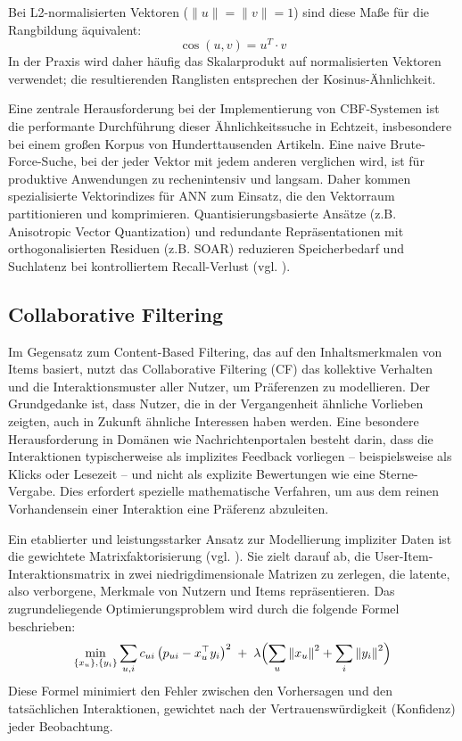 Bei L2-normalisierten Vektoren ($\lVert u \rVert = \lVert v \rVert = 1$) sind diese Maße für die Rangbildung äquivalent:
\[
\cos(u,v) = u^{T} \cdot v
\]
In der Praxis wird daher häufig das Skalarprodukt auf normalisierten Vektoren verwendet; 
die resultierenden Ranglisten entsprechen der Kosinus-Ähnlichkeit.

Eine zentrale Herausforderung bei der Implementierung von CBF-Systemen ist die performante Durchführung 
dieser Ähnlichkeitssuche in Echtzeit, insbesondere bei einem großen Korpus von Hunderttausenden Artikeln. 
Eine naive Brute-Force-Suche, bei der jeder Vektor mit jedem anderen verglichen wird, ist für produktive Anwendungen 
zu rechenintensiv und langsam. Daher kommen spezialisierte Vektorindizes für \ac{ANN} zum Einsatz, 
die den Vektorraum partitionieren und komprimieren. Quantisierungsbasierte Ansätze (z.B. Anisotropic Vector Quantization) 
und redundante Repräsentationen mit orthogonalisierten Residuen (z.B. \ac{SOAR}) reduzieren Speicherbedarf und Suchlatenz 
bei kontrolliertem Recall-Verlust (vgl. \cite{avq_2020,soar_2023}).

\subsection{Collaborative Filtering}
\label{sec:cf}

Im Gegensatz zum Content-Based Filtering, das auf den Inhaltsmerkmalen von Items basiert, 
nutzt das Collaborative Filtering (CF) das kollektive Verhalten und die Interaktionsmuster 
aller Nutzer, um Präferenzen zu modellieren. Der Grundgedanke ist, dass Nutzer, die in der 
Vergangenheit ähnliche Vorlieben zeigten, auch in Zukunft ähnliche Interessen haben werden. 
Eine besondere Herausforderung in Domänen wie Nachrichtenportalen besteht darin, dass die 
Interaktionen typischerweise als implizites Feedback vorliegen – beispielsweise als Klicks 
oder Lesezeit – und nicht als explizite Bewertungen wie eine Sterne-Vergabe. Dies erfordert 
spezielle mathematische Verfahren, um aus dem reinen Vorhandensein einer Interaktion eine 
Präferenz abzuleiten.

Ein etablierter und leistungsstarker Ansatz zur Modellierung impliziter Daten ist die 
gewichtete Matrixfaktorisierung (vgl. \cite{hu_collaborative_2008}). Sie zielt 
darauf ab, die User-Item-Interaktionsmatrix in zwei niedrigdimensionale Matrizen zu 
zerlegen, die latente, also verborgene, Merkmale von Nutzern und Items repräsentieren. 
Das zugrundeliegende Optimierungsproblem wird durch die folgende Formel beschrieben:
\begin{equation}
\label{eq:cf}
\min_{\{x_u\},\{y_i\}} \sum_{u,i} c_{ui}\,\bigl(p_{ui} - x_u^\top y_i\bigr)^2 \;+\; \lambda \Bigl(\sum_u \left\lVert x_u\right\rVert^2 + \sum_i \left\lVert y_i\right\rVert^2\Bigr)
\end{equation}
Diese Formel minimiert den Fehler zwischen den Vorhersagen und den tatsächlichen 
Interaktionen, gewichtet nach der Vertrauenswürdigkeit (Konfidenz) jeder Beobachtung.

